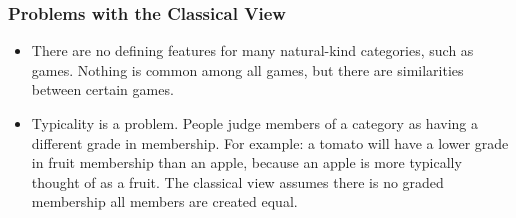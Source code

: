\documentclass[]{article}
\begin{document}
			\subsubsection{Problems with the Classical View}
				\begin{itemize}
					\item There are no defining features for many natural-kind categories, such as games. Nothing is common among all games, but there are similarities between certain games.
					\item Typicality is a problem. People judge members of a category as having a different grade in membership. For example: a tomato will have a lower grade in fruit membership than an apple, because an apple is more typically thought of as a fruit. The classical view assumes there is no graded membership \textendash{} all members are created equal.
				\end{itemize}
\end{document}
